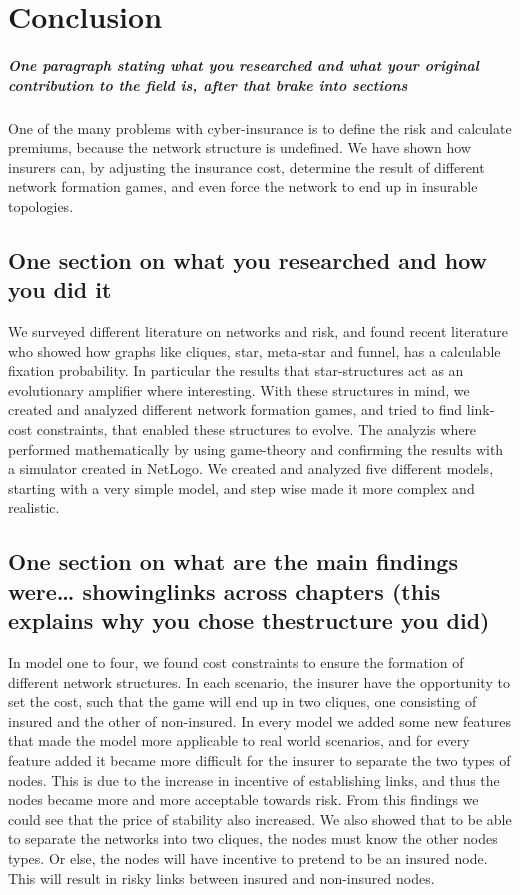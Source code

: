 \section{Conclusion}
\subparagraph{One paragraph stating what you researched and what your original contribution to the field is, after that brake into sections}
One of the many problems with cyber-insurance is to define the risk and calculate premiums, because the network structure is undefined. We have shown how insurers can, by adjusting the insurance cost, determine the result of different network formation games, and even force the network to end up in insurable topologies.  
\subsection{One section on what you researched and how you did it}
We surveyed different literature on networks and risk, and found recent literature who showed how graphs like cliques, star, meta-star and funnel, has a calculable fixation probability. In particular the results that star-structures act as an evolutionary amplifier where interesting. 
With these structures in mind, we created and analyzed different network formation games, and tried to find link-cost constraints, that enabled these structures to evolve. 
The analyzis where performed mathematically by using game-theory and confirming the results with a simulator created in NetLogo.
We created and analyzed five different models, starting with a very simple model, and step wise made it more complex and realistic. 
\subsection{One section on what are the main findings were… showinglinks across chapters (this explains why you chose thestructure you did)}
In model one to four, we found cost constraints to ensure the formation of different network structures. In each scenario, the insurer have the opportunity to set the cost, such that the game will end up in two cliques, one consisting of insured and the other of non-insured. 
In every model we added some new features that made the model more applicable to real world scenarios, and for every feature added it became more difficult for the insurer to separate the two types of nodes. This is due to the increase in incentive of establishing links, and thus the nodes became more and more acceptable towards risk. From this findings we could see that the price of stability also increased. 
We also showed that to be able to separate the networks into two cliques, the nodes must know the other nodes types. Or else, the nodes will have incentive to pretend to be an insured node. This will result in risky links between insured and non-insured nodes. 

